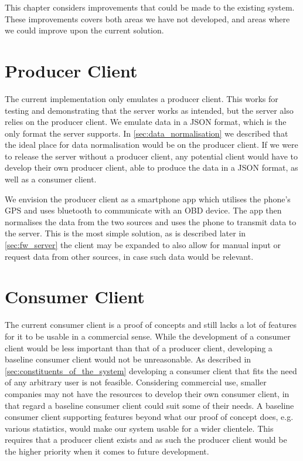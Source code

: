This chapter considers improvements that could be made to the existing system.
These improvements covers both areas we have not developed, and areas where we could improve upon the current solution.
\section{Producer Client}
The current implementation only emulates a producer client.
This works for testing and demonstrating that the server works as intended, but the server also relies on the producer client.
We emulate data in a JSON format, which is the only format the server supports.
In \cref{sec:data_normalisation} we described that the ideal place for data normalisation would be on the producer client.
If we were to release the server without a producer client, any potential client would have to develop their own producer client, able to produce the data in a JSON format, as well as a consumer client.

\bigskip
We envision the producer client as a smartphone app which utilises the phone's GPS and uses bluetooth to communicate with an \ac{OBD} device.
The app then normalises the data from the two sources and uses the phone to transmit data to the server.
This is the most simple solution, as is described later in \cref{sec:fw_server} the client may be expanded to also allow for manual input or request data from other sources, in case such data would be relevant.
\section{Consumer Client}
The current consumer client is a proof of concepts and still lacks a lot of features for it to be usable in a commercial sense.
While the development of a consumer client would be less important than that of a producer client, developing a baseline consumer client would not be unreasonable.
As described in \cref{sec:constituents_of_the_system} developing a consumer client that fits the need of any arbitrary user is not feasible.
Considering commercial use, smaller companies may not have the resources to develop their own consumer client, in that regard a baseline consumer client could suit some of their needs.
A baseline consumer client supporting features beyond what our proof of concept does, e.g. various statistics, would make our system usable for a wider clientele.
This requires that a producer client exists and as such the producer client would be the higher priority when it comes to future development.
